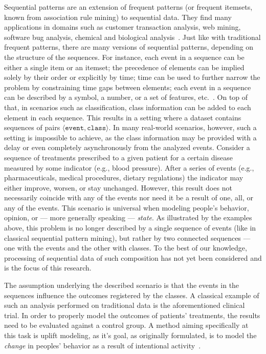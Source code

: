 \documentclass[runningheads,a4paper]{llncs}
\begin{document}
Sequential patterns are an extension of frequent patterns (or frequent itemsets, known from association rule mining) to sequential data.
They find many applications in domains such as customer transaction analysis, web mining, software bug analysis, chemical and biological analysis~\cite{Aggarwal:2014}.
Just like with traditional frequent patterns, there are many versions of sequential patterns, depending on the structure of the sequences.
For instance, each event in a sequence can be either a single item or an itemset; the precedence of elements can be implied solely by their order or explicitly by time; time can be used to further narrow the problem by constraining time gaps between elements; each event in a sequence can be described by a symbol, a number, or a set of features, etc.~\cite{Dong:2009}.
On top of that, in scenarios such as classification, class information can be added to each element in each sequence.
This results in a setting where a dataset contains sequences of pairs $\langle\texttt{event}, \texttt{class}\rangle$.
In many real-world scenarios, however, such a setting is impossible to achieve, as the class information may be provided with a delay or even completely asynchronously from the analyzed events.
Consider a sequence of treatments prescribed to a given patient for a certain disease measured by some indicator (e.g., blood pressure).
After a series of events (e.g., pharmaceuticals, medical procedures, dietary regulations) the indicator may either improve, worsen, or stay unchanged.
However, this result does not necessarily coincide with any of the events nor need it be a result of one, all, or any of the events.
This scenario is universal when modeling people's behavior, opinion, or --- more generally speaking --- \textit{state}.
As illustrated by the examples above, this problem is no longer described by a single sequence of events (like in classical sequential pattern mining), but rather by two connected sequences --- one with the events and the other with classes.
To the best of our knowledge, processing of sequential data of such composition has not yet been considered and is the focus of this research.

The assumption underlying the described scenario is that the events in the sequences influence the outcomes registered by the classes.
A classical example of such an analysis performed on traditional data is the aforementioned clinical trial.
In order to properly model the outcomes of patients' treatments, the results need to be evaluated against a control group.
A method aiming specifically at this task is uplift modeling, as it's goal, as originally formulated, is to model the \textit{change} in peoples' behavior as a result of intentional activity~\cite{Radcliffe:1999}.
\end{document}
